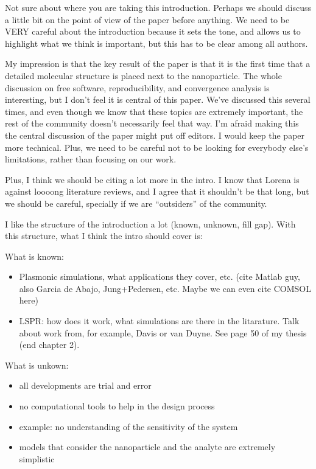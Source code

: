{\color{red} Not sure about where you are taking this introduction.
Perhaps we should discuss a little bit on the point of view of the paper before anything.
We need to be VERY careful about the introduction because it sets the tone, and allows us to highlight what we think is important, but this has to be clear among all authors. 

My impression is that the key result of the paper is that it is the first time that a detailed molecular structure is placed next to the nanoparticle.
The whole discussion on free software, reproducibility, and convergence analysis is interesting, but I don't feel it is central of this paper. 
We've discussed this several times, and even though we know that these topics are extremely important, the rest of the community doesn't necessarily feel that way.
I'm afraid making this the central discussion of the paper might put off editors. 
I would keep the paper more technical.
Plus, we need to be careful not to be looking for everybody else's limitations, rather than focusing on our work.

Plus, I think we should be citing a lot more in the intro. 
I know that Lorena is against loooong literature reviews, and I agree that it shouldn't be that long, but we should be careful, specially if we are ``outsiders'' of the community.

I like the structure of the introduction a lot (known, unknown, fill gap). 
With this structure, what I think the intro should cover is:

What is known:
\begin{itemize}
\item Plasmonic simulations, what applications they cover, etc. (cite Matlab guy, also Garcia de Abajo, Jung+Pedersen, etc. Maybe we can even cite COMSOL here)
\item LSPR: how does it work, what simulations are there in the litarature. Talk about work from, for example, Davis or van Duyne. See page 50 of my thesis (end chapter 2).
\end{itemize}

What is unkown:
\begin{itemize}
\item all developments are trial and error
\item no computational tools to help in the design process
\item example: no understanding of the sensitivity of the system
\item models that consider the nanoparticle and the analyte are extremely simplistic
\end{itemize}

}
